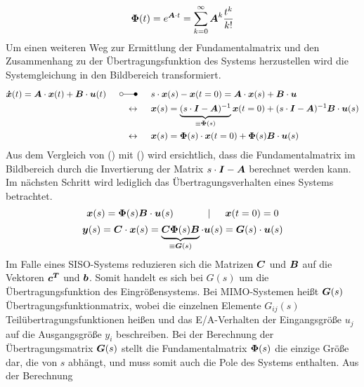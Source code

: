 \begin{equation}
\boldsymbol{\Phi}(t) = e^{\boldsymbol{A}\cdot t} = \sum^{\infty}_{k=0} \boldsymbol{A}^k\frac{t^k}{k!}
\end{equation}
Um einen weiteren Weg zur Ermittlung der Fundamentalmatrix und den Zusammenhang zu der Übertragungsfunktion des Systems herzustellen wird die Systemgleichung in den Bildbereich transformiert.
\begin{equation}
\begin{split}
\bs{\dot{x}}(t) = \bs{A}\cdot \bs{x}(t) + \bs{B}\cdot\bs{u}(t) \myLaplace &s\cdot\bs{x}(s) - \bs{x}(t=0) = \bs{A}\cdot \bs{x}(s) + \bs{B}\cdot \bs{u}
\\
\leftrightarrow \hspace{15pt} &\bs{x}(s) = \underbrace{(s\cdot \bs{I} - \bs{A})^{-1}}_{\equiv \bs{\Phi}(s)}\bs{x}(t=0) + (s\cdot \bs{I}-\bs{A})^{-1}\bs{B}\cdot \bs{u}(s) 
\\
\leftrightarrow \hspace{15pt}&\bs{x}(s) = \bs{\Phi}(s)\cdot \bs{x}(t=0) +\bs{\Phi}(s)\bs{B}\cdot \bs{u}(s)
\end{split}
\label{eq_fMat_bildbereich}
\end{equation}
Aus dem Vergleich von (\cite{eq_fMat_bildbereich}) mit (\cite{eq_fMat_zeitbereich}) wird ersichtlich, dass die Fundamentalmatrix im Bildbereich durch die Invertierung der Matrix $s\cdot \boldsymbol{I}-\boldsymbol{A}$ berechnet werden kann. Im nächsten Schritt wird lediglich das Übertragungsverhalten eines Systems betrachtet.
\begin{equation}
\boldsymbol{x}(s) = \boldsymbol{\Phi}(s)\boldsymbol{B}\cdot \boldsymbol{u}(s) \hspace{35pt} \vert \hspace{15pt} \boldsymbol{x}(t=0) = 0
\end{equation}
\begin{equation}
\boldsymbol{y}(s) = \boldsymbol{C}\cdot \boldsymbol{x}(s) = \underbrace{\boldsymbol{C}\boldsymbol{\Phi}(s)\boldsymbol{B}}_{\equiv \boldsymbol{G}(s)}\cdot \boldsymbol{u}(s) = \boldsymbol{G}(s)\cdot \boldsymbol{u}(s)
\end{equation}
Im Falle eines SISO-Systems reduzieren sich die Matrizen $\boldsymbol{C}$ und $\boldsymbol{B}$ auf die Vektoren $\boldsymbol{c^T}$ und $\boldsymbol{b}$. Somit handelt es sich bei $G(s)$ um die Übertragungsfunktion des Eingrößensystems. Bei MIMO-Systemen heißt $\boldsymbol{G}(s)$ Übertragungsfunktionmatrix, wobei die einzelnen Elemente $G_{ij}(s)$ Teilübertragungsfunktionen heißen und das E/A-Verhalten der Eingangsgröße $u_j$ auf die Ausgangsgröße $y_i$ beschreiben. Bei der Berechnung der Übertragungsmatrix $\boldsymbol{G}(s)$ stellt die Fundamentalmatrix $\boldsymbol{\Phi}(s)$ die einzige Größe dar, die von $s$ abhängt, und muss somit auch die Pole des Systems enthalten. Aus der Berechnung
